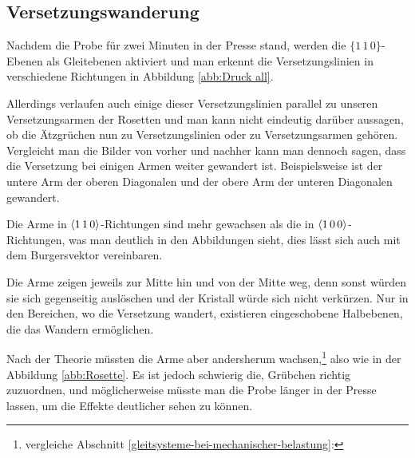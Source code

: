 \documentclass[12pt,a4paper]{scrartcl}
\numberwithin{equation}{section} %
\begin{document}
\hypertarget{versetzungswanderung}{%
\subsection{Versetzungswanderung}\label{versetzungswanderung}}

Nachdem die Probe für zwei Minuten in der Presse stand, werden die
$\lbrace1\,1\,0\rbrace$-Ebenen als Gleitebenen aktiviert und man
erkennt die Versetzungslinien in verschiedene Richtungen in Abbildung \ref{abb:Druck all}.

Allerdings verlaufen auch einige dieser Versetzungslinien parallel zu
unseren Versetzungsarmen der Rosetten und man kann nicht eindeutig
darüber aussagen, ob die Ätzgrüchen nun zu Versetzungslinien oder zu
Versetzungsarmen gehören. Vergleicht man die Bilder von vorher und
nachher kann man dennoch sagen, dass die Versetzung bei einigen Armen
weiter gewandert ist. Beispielsweise ist der untere Arm der oberen
Diagonalen und der obere Arm der unteren Diagonalen gewandert.

Die Arme in $\expval{1\,1\,0}$-Richtungen sind mehr gewachsen als die
in $\expval{1\,0\,0}$-Richtungen, was man deutlich in den Abbildungen
sieht, dies lässt sich auch mit dem Burgersvektor vereinbaren.

Die Arme zeigen jeweils zur Mitte hin und von der Mitte weg, denn sonst
würden sie sich gegenseitig auslöschen und der Kristall würde sich nicht
verkürzen. Nur in den Bereichen, wo die Versetzung wandert, existieren
eingeschobene Halbebenen, die das Wandern ermöglichen.

Nach der Theorie müssten die Arme aber andersherum wachsen,\footnote{vergleiche Abschnitt \ref{gleitsysteme-bei-mechanischer-belastung}: } also wie in
der Abbildung \ref{abb:Rosette}. Es ist jedoch schwierig die, Grübchen richtig
zuzuordnen, und möglicherweise müsste man die Probe länger in der Presse
lassen, um die Effekte deutlicher sehen zu können.
\end{document}
